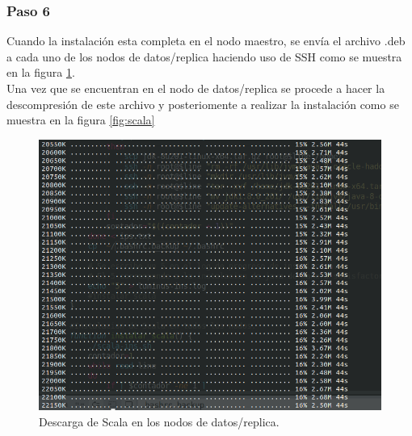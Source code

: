 \subsubsection{Paso 6}
Cuando la instalación esta completa en el nodo maestro, se envía el archivo .deb a cada uno de los nodos de datos/replica haciendo uso de SSH como se muestra en la figura \ref{fig:scalaesclavo}.\\
Una vez que se encuentran en el nodo de datos/replica se procede a hacer la descompresión de este archivo y posteriomente a realizar la instalación como se muestra en la figura \ref{fig:scala} 
\begin{figure}[H]
	\hypertarget{fig:scalaesclavo}{\hspace{1pt}}
	\begin{center}	
		\includegraphics[width=.75\textwidth]{capitulo5/images/descargascalaesclavo.png}
		\caption{Descarga de Scala en los nodos de datos/replica.}
		\label{fig:scalaesclavo}
	\end{center}
\end{figure}
